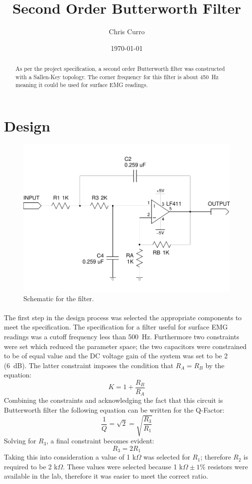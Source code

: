 \documentclass[justified,nobib]{tufte-handout}
\title{Second Order Butterworth Filter}
\author{Chris Curro}
\date{\today}
\begin{document}
\maketitle
\begin{abstract}
As per the project specification, a second order Butterworth filter was
constructed with a Sallen-Key topology. The corner frequency for this filter is
about 450~Hz meaning it could be used for surface EMG readings.
\end{abstract}
\section{Design}
\vspace{-0.2in}
\begin{figure}[h]
\centering
\label{schem}
\includegraphics[width=0.9\linewidth,trim=0 .3in 0 .35in,clip=true]{schem.pdf}
\caption{Schematic for the filter.}
\end{figure}
\paragraph{} The first step in the design process was selected the appropriate
components to meet the specification. The specification for a filter useful for
surface EMG readings was a cutoff frequency less than 500~Hz. Furthermore two
constraints were set which reduced the parameter space; the two capacitors were
constrained to be of equal value and the DC voltage gain of the system was set
to be 2 (6~dB). The latter constraint imposes the condition that $R_A = R_B$ by
the equation:
\begin{equation}
K = 1 + \frac{R_B}{R_A}
\end{equation}
Combining the constraints and acknowledging the fact that this circuit is
Butterworth filter the following equation can be written for the Q-Factor:
\begin{equation}
\frac{1}{Q} = \sqrt{2} = \sqrt{\frac{R_3}{R_1}}
\end{equation}
Solving for $R_3$, a final constraint becomes evident:
\begin{equation}
R_3 = 2R_1
\end{equation}
Taking this into consideration a value of 1 k$\Omega$ was selected for $R_1$;
therefore $R_2$ is required to be 2 k$\Omega$. These values were selected
because 1 k$\Omega \pm 1\%$ resistors were available in the lab, therefore it
was easier to meet the correct ratio.
\end{document}
